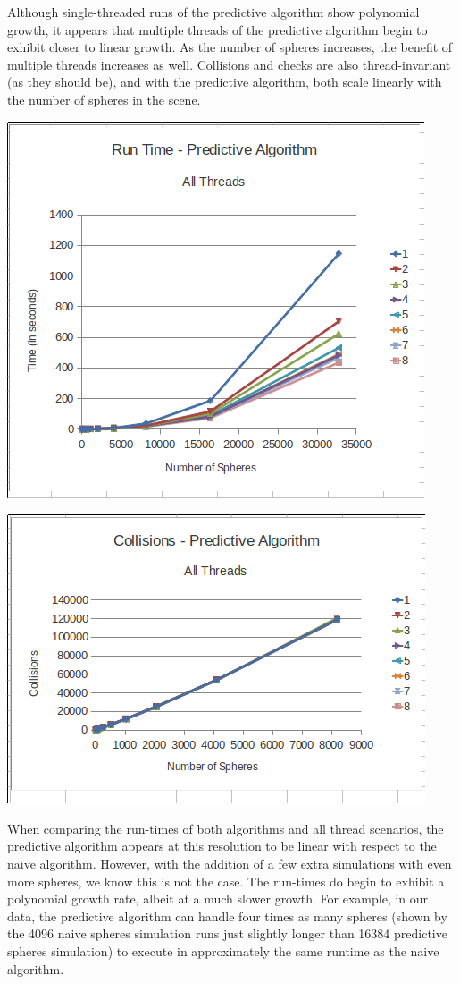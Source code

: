 \documentclass[conference]{IEEEtran}
\begin{document}
Although single-threaded runs of the predictive algorithm show polynomial growth, it appears that multiple threads of the predictive algorithm begin to exhibit closer to linear growth.  As the number of spheres increases, the benefit of multiple threads increases as well.  Collisions and checks are also thread-invariant (as they should be), and with the predictive algorithm, both scale linearly with the number of spheres in the scene.

\begin{center}
	\includegraphics[width=.45\textwidth]{runtime_predictive_allthreads.png}
\end{center}

\begin{center}
	\includegraphics[width=.45\textwidth]{collisions_predictive_allthreads.png}
\end{center}

When comparing the run-times of both algorithms and all thread scenarios, the predictive algorithm appears at this resolution to be linear with respect to the naive algorithm.  However, with the addition of a few extra simulations with even more spheres, we know this is not the case.  The run-times do begin to exhibit a polynomial growth rate, albeit at a much slower growth.  For example, in our data, the predictive algorithm can handle four times as many spheres (shown by the 4096 naive spheres simulation runs just slightly longer than 16384 predictive spheres simulation) to execute in approximately the same runtime as the naive algorithm.
\end{document}

